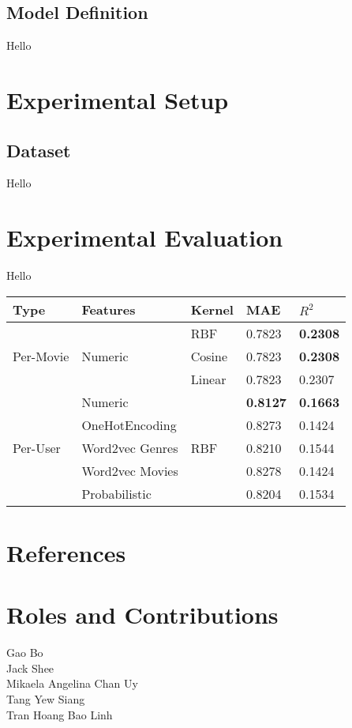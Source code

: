 \documentclass[letterpaper]{article}
\begin{document}
\subsection{Model Definition}
Hello

\section{Experimental Setup}
\subsection{Dataset}
Hello

\section{Experimental Evaluation}
Hello 
\begin{center}
	\begin{tabular}{lllll}
		\hline
		Type & Features & Kernel & MAE & $R^{2}$ \\
		\hline
		\multirow{3}{*}{Per-Movie} &\multirow{3}{*}{Numeric}
		 & RBF & 0.7823 & \textbf{0.2308}\\
		& & Cosine & 0.7823 & \textbf{0.2308} \\
		& & Linear & 0.7823 & 0.2307 \\
		\hline
		\multirow{5}{*}{Per-User} & Numeric & \multirow{5}{*}{RBF} & \textbf{0.8127} & \textbf{0.1663} \\
		& OneHotEncoding & & 0.8273 & 0.1424 \\
		& Word2vec Genres & & 0.8210 & 0.1544 \\
		& Word2vec Movies & & 0.8278 & 0.1424 \\
		& Probabilistic   & & 0.8204 & 0.1534\\
		\hline
	\end{tabular}
\end{center}

\section{References}


\section{Roles and Contributions}

\begin{description}
\item [Gao Bo]
\item [Jack Shee]
\item [Mikaela Angelina Chan Uy] 
\item [Tang Yew Siang]
\item [Tran Hoang Bao Linh]
\end{description}
\end{document}
